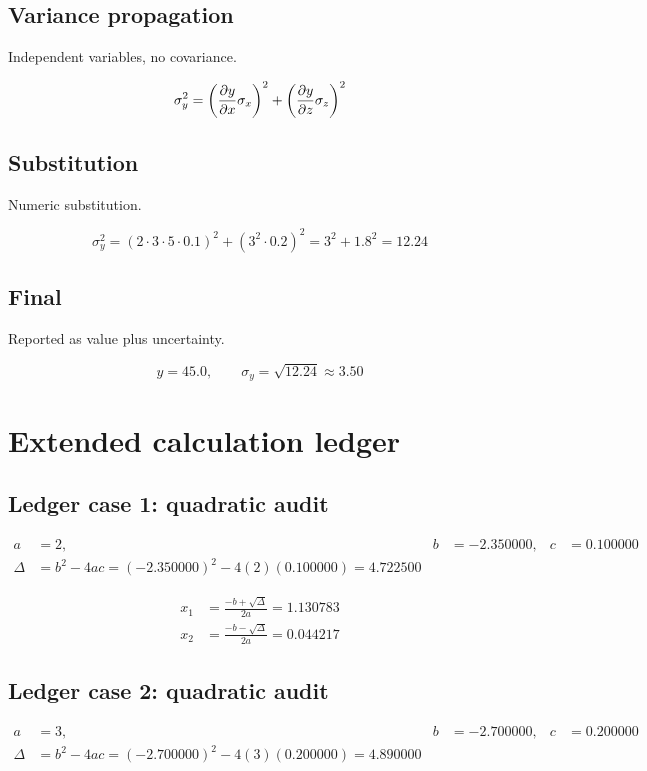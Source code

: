 \documentclass[11pt,a4paper]{article}
\begin{document}
\subsection{Variance propagation}
Independent variables, no covariance.
\begin{derivationbox}
\[
\sigma_y^2=\left(\pdv{y}{x}\sigma_x\right)^2+\left(\pdv{y}{z}\sigma_z\right)^2
\]
\end{derivationbox}

\subsection{Substitution}
Numeric substitution.
\begin{derivationbox}
\[
\sigma_y^2=(2\cdot3\cdot5\cdot0.1)^2+(3^2\cdot0.2)^2=3^2+1.8^2=12.24
\]
\end{derivationbox}

\subsection{Final}
Reported as value plus uncertainty.
\begin{derivationbox}
\[
y=45.0,\qquad \sigma_y=\sqrt{12.24}\approx3.50
\]
\end{derivationbox}

\section{Extended calculation ledger}

\subsection{Ledger case 1: quadratic audit}
\begin{align}
a &= 2, & b &= -2.350000, & c &= 0.100000 \\
\Delta &= b^2-4ac = (-2.350000)^2 - 4(2)(0.100000) = 4.722500
\end{align}

\begin{align}
x_1 &= \frac{-b+\sqrt{\Delta}}{2a} = 1.130783 \\
x_2 &= \frac{-b-\sqrt{\Delta}}{2a} = 0.044217
\end{align}

\subsection{Ledger case 2: quadratic audit}
\begin{align}
a &= 3, & b &= -2.700000, & c &= 0.200000 \\
\Delta &= b^2-4ac = (-2.700000)^2 - 4(3)(0.200000) = 4.890000
\end{align}
\end{document}
